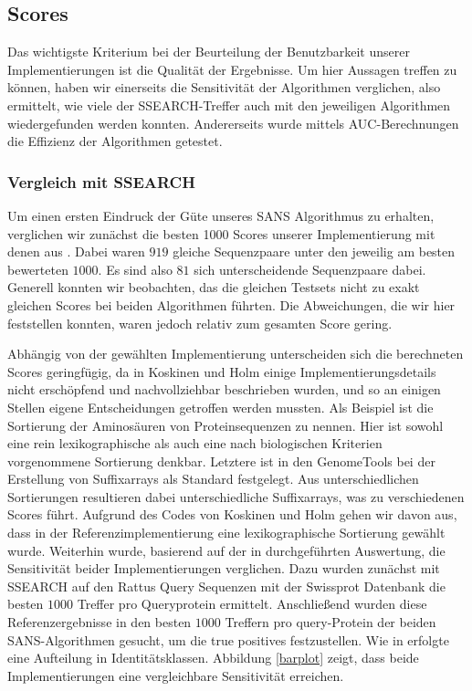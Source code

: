 \documentclass{article}
\begin{document}
\subsection{Scores}

Das wichtigste Kriterium bei der Beurteilung der Benutzbarkeit unserer Implementierungen ist die Qualität der Ergebnisse. Um hier Aussagen treffen
zu können, haben wir einerseits die Sensitivität der Algorithmen verglichen, also ermittelt, wie viele der SSEARCH-Treffer auch mit den jeweiligen Algorithmen wiedergefunden werden konnten. Andererseits wurde mittels AUC-Berechnungen die Effizienz der Algorithmen getestet.

\subsubsection{Vergleich mit SSEARCH}

Um einen ersten Eindruck der Güte unseres SANS Algorithmus zu erhalten, verglichen wir zunächst die besten 1000 Scores unserer Implementierung
mit denen aus \cite{Holm}. Dabei waren $919$ gleiche Sequenzpaare unter den jeweilig am besten bewerteten $1000$. Es sind also $81$ sich unterscheidende
Sequenzpaare dabei. Generell konnten wir beobachten, das die gleichen Testsets nicht zu exakt gleichen Scores bei beiden Algorithmen führten. Die
Abweichungen, die wir hier feststellen konnten, waren jedoch relativ zum gesamten Score gering.

Abhängig von der gewählten Implementierung unterscheiden sich die berechneten Scores geringfügig,  da in Koskinen und Holm  \cite{Holm} einige Implementierungsdetails nicht erschöpfend und nachvollziehbar beschrieben wurden,
und so an einigen Stellen eigene Entscheidungen getroffen werden mussten. Als Beispiel ist die Sortierung der Aminosäuren von Proteinsequenzen
zu nennen. Hier ist sowohl eine rein lexikographische als auch eine nach biologischen Kriterien vorgenommene Sortierung denkbar. Letztere ist in den GenomeTools \cite{gtools} bei der Erstellung von Suffixarrays als Standard festgelegt. Aus unterschiedlichen
Sortierungen resultieren dabei unterschiedliche Suffixarrays, was zu verschiedenen Scores führt. Aufgrund des Codes von Koskinen und Holm gehen wir davon aus, dass in der Referenzimplementierung eine lexikographische Sortierung gewählt wurde. 
Weiterhin wurde, basierend auf der in \cite{Holm} durchgeführten Auswertung, die Sensitivität beider Implementierungen verglichen. Dazu wurden zunächst mit SSEARCH auf den Rattus Query
Sequenzen mit der Swissprot Datenbank die besten $1000$ Treffer pro Queryprotein ermittelt. Anschließend wurden diese Referenzergebnisse in den besten $1000$ Treffern pro query-Protein der beiden SANS-Algorithmen gesucht, um die true positives festzustellen. Wie in \cite{Holm} erfolgte eine Aufteilung in Identitätsklassen. Abbildung \ref{barplot} zeigt, dass beide
Implementierungen eine vergleichbare Sensitivität erreichen.
\end{document}
